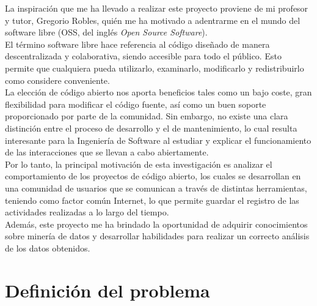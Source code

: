 \documentclass[a4paper, 12pt]{book}
\begin{document}
La inspiración que me ha llevado a realizar este proyecto proviene de mi profesor y tutor, Gregorio Robles, quién me ha
motivado a adentrarme en el mundo del software libre (OSS, del inglés \textit{Open Source Software}).
\\El término software libre hace referencia al código diseñado de manera descentralizada y colaborativa, siendo
accesible para todo el público. Esto permite que cualquiera pueda utilizarlo, examinarlo, modificarlo y
redistribuirlo como considere conveniente.
\\La elección de código abierto nos aporta beneficios tales como un bajo coste, gran flexibilidad para
modificar el código fuente, así como un buen soporte proporcionado por parte de la comunidad.
Sin embargo, no existe una clara distinción entre el proceso de desarrollo y el de mantenimiento, lo cual resulta interesante
para la Ingeniería de Software al estudiar y explicar el funcionamiento de las interacciones que se llevan a cabo abiertamente.
\\Por lo tanto, la principal motivación de esta investigación es analizar el comportamiento de los proyectos de código abierto, los cuales se
desarrollan en una comunidad de usuarios que se comunican a través de distintas herramientas, teniendo como factor común Internet, lo que
permite guardar el registro de las actividades realizadas a lo largo del tiempo.
\\Además, este proyecto me ha brindado la oportunidad de adquirir conocimientos sobre minería de datos y desarrollar
habilidades para realizar un correcto análisis de los datos obtenidos.

\section{Definición del problema}
\label{sec:definición del problema}
\end{document}
